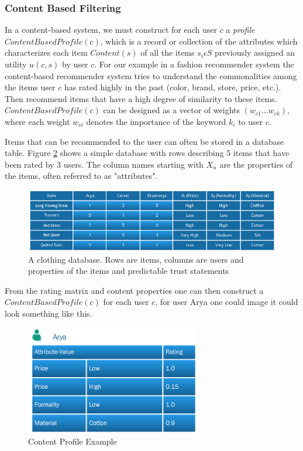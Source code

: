 \subsubsection{Content Based Filtering}

In a content-based system, we must construct for each user $c$ a \emph{profile} $ContentBasedProfile(c)$, which is a record or collection of the attributes which characterizes each item $Content(s)$ of all the items $s_{i} \epsilon S$ previously assigned an utility $u(c, s)$ by user $c$. For our example in a fashion recommender system the content-based recommender system tries to understand the commonalities among the items user $c$ has rated highly in the past (color, brand, store, price, etc.). Then recommend items that have a high degree of similarity to these items. $ContentBasedProfile(c)$ can be designed as a vector of weights $(w_{c1} ... w_{ck})$, where each weight $w_{ci}$ denotes the importance of the keyword $k_{i}$ to user $c$.

Items that can be recommended to the user can often be stored in a database table. Figure \ref{figure:contentbaseddb} shows a simple database with rows describing 5 items that have been rated by 3 users. The column names starting with $X_{n}$ are the properties of the items, often referred to as "attributes".

\begin{figure}[H]
    \includegraphics[width=5in]{image/contentbaseddb.png}
    \centering
    \caption[A clothing database]{A clothing database. Rows are items, columns are users and properties of the items and predictable trust statements}
    \label{figure:contentbaseddb}
\end{figure}

From the rating matrix and content properties one can then construct a $ContentBasedProfile(c)$ for each user $c$, for user Arya one could image it could look something like this.

\begin{figure}[H]
    \includegraphics[width=3in]{image/contentprofile.png}
    \centering
    \caption[Content Profile Example]{Content Profile Example}
    \label{figure:contentbaseddb}
\end{figure}

